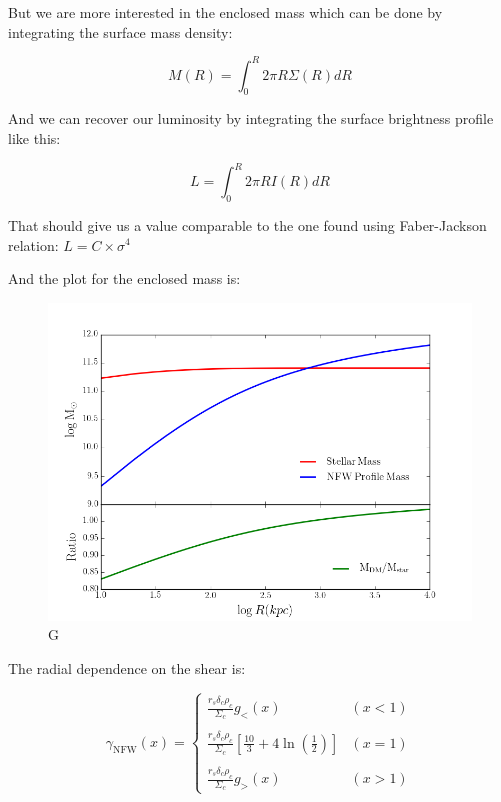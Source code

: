 But we are more interested in the enclosed mass which can be done by integrating the surface mass density:

\begin{equation}
M(R)=\int_{0}^{R}2\pi R\Sigma(R)dR
\end{equation}

And we can recover our luminosity by integrating the surface brightness profile like this:

\begin{equation}
L=\int_{0}^{R}2\pi RI(R)dR
\end{equation}

That should give us a value comparable to the one found using Faber-Jackson relation: $L=C\times\sigma^{4}$

And the plot for the enclosed mass is:

\begin{figure}[H]
\centering
\includegraphics[width=12cm]{images/DM_fraction.png}
\caption[M]{G}
\end{figure}

The radial dependence on the shear is:

\begin{equation}
\gamma_{\text{NFW}}(x) = \left\lbrace
\begin{array}{lll}
\frac{r_{s}\delta_{c}\rho_{c}}{\Sigma_c}g_{<}(x) & (x<1)\\\\
\frac{r_{s}\delta_{c}\rho_{c}}{\Sigma_c}\left[\frac{10}{3}+4 \ln \left(\frac{1}{2}\right)\right] & (x=1)\\\\
\frac{r_{s}\delta_{c}\rho_{c}}{\Sigma_c}g_{>}(x) & (x>1)
\end{array}
\right.
\end{equation} 

